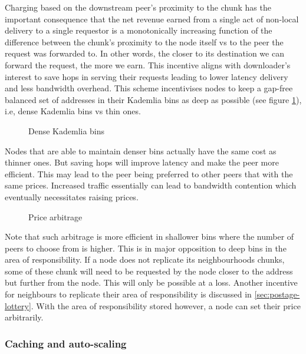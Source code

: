 Charging based on the downstream peer's proximity to the chunk has the important consequence that the net revenue earned from a single act of non-local delivery to a single requestor is a monotonically increasing function of the difference between the chunk's proximity to the node itself vs to the peer the request was forwarded to. In other words, the closer to its destination we can forward the request, the more we earn. This incentive aligns with downloader's interest to save hops in serving their requests leading to lower latency delivery and less bandwidth overhead. This scheme incentivises nodes to keep a gap-free balanced set of addresses in their Kademlia bins as deep as possible (see figure \ref{fig:densebins}), i.e, dense Kademlia bins vs thin ones.

\begin{figure}[htbp]
   \centering
   \caption[Dense Kademlia bins]{Dense Kademlia bins}
   \label{fig:densebins}
\end{figure}


Nodes that are able to maintain denser bins actually have the same cost as thinner ones. But saving hops will improve latency and make the peer more efficient. This may lead to the peer being preferred to other peers that with the same prices. Increased traffic essentially can lead to bandwidth contention which eventually necessitates raising prices. 

\begin{figure}[htbp]
   \centering
   \caption[Price arbitrage]{Price arbitrage}
   \label{fig:pricearbitrage}
\end{figure}

Note that such arbitrage is more efficient in shallower bins where the number of peers to choose from is higher. This is in major opposition to deep bins in the area of responsibility. If a node does not replicate its neighbourhoods chunks, some of these chunk will need to be requested by the node closer to the address but further from the node. This will only be possible at a loss. Another incentive for neighbours to replicate their area of responsibility is discussed in \ref{sec:postage-lottery}. With the area of responsibility stored however, a node can set their price arbitrarily. 


\subsubsection{Caching and auto-scaling}\label{sec:caching}

